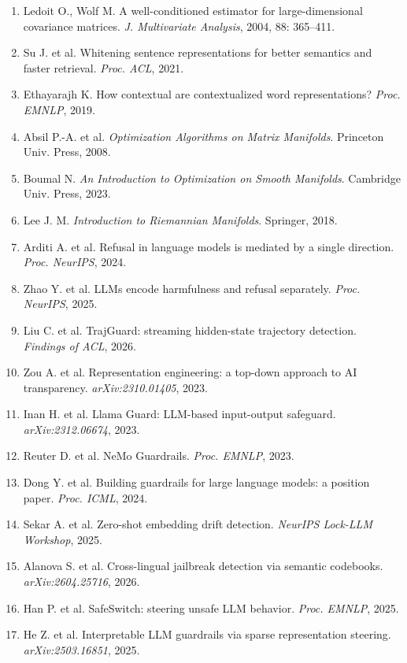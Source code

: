 \documentclass[10pt,a4paper]{article}
\newcommand{\secfmt}[1]{\vspace{5pt}\noindent{\large\bfseries #1}\par\vspace{1.5pt}}
\begin{document}
\secfmt{Список литературы / References}
\begingroup\footnotesize

\begin{enumerate}\setlength{\itemsep}{0pt}\setlength{\parsep}{0pt}
\item Ledoit O., Wolf M. A well-conditioned estimator for large-dimensional covariance matrices. \emph{J. Multivariate Analysis}, 2004, 88: 365--411.
\item Su J. et al. Whitening sentence representations for better semantics and faster retrieval. \emph{Proc. ACL}, 2021.
\item Ethayarajh K. How contextual are contextualized word representations? \emph{Proc. EMNLP}, 2019.
\item Absil P.-A. et al. \emph{Optimization Algorithms on Matrix Manifolds}. Princeton Univ. Press, 2008.
\item Boumal N. \emph{An Introduction to Optimization on Smooth Manifolds}. Cambridge Univ. Press, 2023.
\item Lee J. M. \emph{Introduction to Riemannian Manifolds}. Springer, 2018.
\item Arditi A. et al. Refusal in language models is mediated by a single direction. \emph{Proc. NeurIPS}, 2024.
\item Zhao Y. et al. LLMs encode harmfulness and refusal separately. \emph{Proc. NeurIPS}, 2025.
\item Liu C. et al. TrajGuard: streaming hidden-state trajectory detection. \emph{Findings of ACL}, 2026.
\item Zou A. et al. Representation engineering: a top-down approach to AI transparency. \emph{arXiv:2310.01405}, 2023.
\item Inan H. et al. Llama Guard: LLM-based input-output safeguard. \emph{arXiv:2312.06674}, 2023.
\item Reuter D. et al. NeMo Guardrails. \emph{Proc. EMNLP}, 2023.
\item Dong Y. et al. Building guardrails for large language models: a position paper. \emph{Proc. ICML}, 2024.
\item Sekar A. et al. Zero-shot embedding drift detection. \emph{NeurIPS Lock-LLM Workshop}, 2025.
\item Alanova S. et al. Cross-lingual jailbreak detection via semantic codebooks. \emph{arXiv:2604.25716}, 2026.
\item Han P. et al. SafeSwitch: steering unsafe LLM behavior. \emph{Proc. EMNLP}, 2025.
\item He Z. et al. Interpretable LLM guardrails via sparse representation steering. \emph{arXiv:2503.16851}, 2025.

\end{enumerate}
\end{document}
